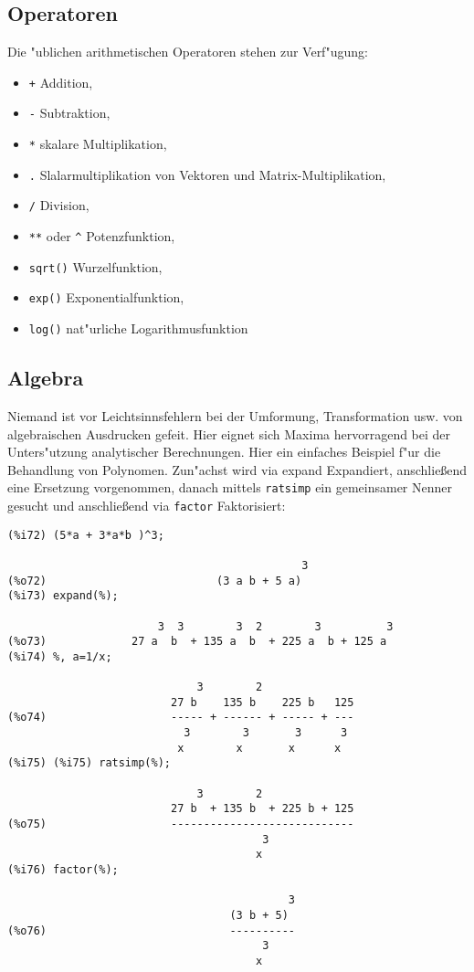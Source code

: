 \documentclass[spanish,12pt,a4paper]{article}
\begin{document}
\subsection{Operatoren}

Die "ublichen arithmetischen Operatoren stehen zur Verf"ugung:

\begin{itemize}
\item \verb|+|  Addition,
\item \verb|-| Subtraktion,
\item \verb|*| skalare Multiplikation,
\item \verb|.| Slalarmultiplikation von Vektoren und Matrix-Multiplikation,
\item \verb|/| Division,
\item \verb|**| oder \verb|^| Potenzfunktion,
\item \verb|sqrt()| Wurzelfunktion,
\item \verb|exp()| Exponentialfunktion,
\item \verb|log()| nat"urliche Logarithmusfunktion
\end{itemize}


\subsection{Algebra}

Niemand ist vor Leichtsinnsfehlern bei der Umformung, Transformation usw. von algebraischen Ausdrucken gefeit. Hier eignet sich Maxima hervorragend bei der Unters"utzung analytischer Berechnungen.
Hier ein einfaches Beispiel f"ur die Behandlung von Polynomen. Zun"achst wird via expand Expandiert, anschließend eine Ersetzung vorgenommen, danach mittels \verb|ratsimp| ein gemeinsamer Nenner gesucht und anschließend via \verb|factor| Faktorisiert:

\scriptsize
\begin{verbatim}
(%i72) (5*a + 3*a*b )^3;

                                             3
(%o72)                          (3 a b + 5 a)
(%i73) expand(%);

                       3  3        3  2        3          3
(%o73)             27 a  b  + 135 a  b  + 225 a  b + 125 a
(%i74) %, a=1/x;

                             3        2
                         27 b    135 b    225 b   125
(%o74)                   ----- + ------ + ----- + ---
                           3        3       3      3
                          x        x       x      x
(%i75) (%i75) ratsimp(%);

                             3        2
                         27 b  + 135 b  + 225 b + 125
(%o75)                   ----------------------------
                                       3
                                      x
(%i76) factor(%);

                                           3
                                  (3 b + 5)
(%o76)                            ----------
                                       3
                                      x
\end{verbatim}
\normalsize
\end{document}
